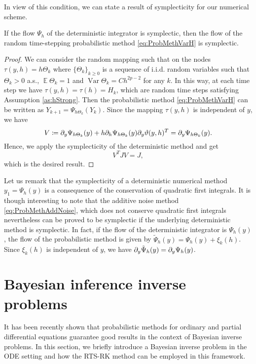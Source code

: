 \documentclass{siamart1116}
\numberwithin{theorem}{section}
\newcommand{\pdv}[2]{\ensuremath\partial_{#2}#1}
\newcommand{\defeq}{\coloneqq}
\newcommand{\Var}{\operatorname{Var}}
\newcommand{\E}{\operatorname{\mathbb{E}}}
\newcommand{\corr}[1]{{\color{bordeaux}#1}}
\begin{document}
In view of this condition, we can state a result of symplecticity for our numerical scheme.
\begin{theorem}\label{thm:SymplecticRandH} If the flow $\Psi_h$ of the deterministic integrator is symplectic, then the flow of the random time-stepping probabilistic method \eqref{eq:ProbMethVarH} is symplectic.
\end{theorem}
\corr{\begin{proof} We can consider the random mapping such that on the nodes $\tau(y, h) = h\Theta_k$ where $\{\Theta_k\}_{k \geq 0}$ is a sequence of i.i.d. random variables such that $\Theta_k > 0$ a.s., $\E\Theta_k = 1$ and $\Var\Theta_k = Ch^{2p - 2}$ for any $k$. In this way, at each time step we have $\tau(y, h) = \tau(h) = H_k$, which are random time steps satisfying Assumption \ref{as:hStrong}. Then the probabilistic method \eqref{eq:ProbMethVarH} can be written as $Y_{k+1} = \Psi_{h\Theta_k}(Y_{k})$. Since the mapping $\tau(y, h)$ is independent of $y$, we have
\begin{equation}
	V \defeq \pdv{\Psi_{h\Theta_k}(y)}{y} + h\pdv{\Psi_{h\Theta_k}(y)}{h}\pdv{\vartheta(y, h)}{y}^T = \pdv{\Psi_{h\Theta_k}(y)}{y}.
\end{equation}
Hence, we apply the symplecticity of the deterministic method and get
\begin{equation}
	V^T J V = J,
\end{equation}
which is the desired result.
\end{proof}}

\corr{\begin{remark} Let us remark that the symplecticity of a deterministic numerical method $y_1 = \Psi_h(y)$ is a consequence of the conservation of quadratic first integrals. It is though interesting to note that the additive noise method \eqref{eq:ProbMethAddNoise}, which does not conserve quadratic first integrals nevertheless can be proved to be symplectic if the underlying deterministic method is symplectic. In fact, if the flow of the deterministic integrator is $\Psi_h(y)$, the flow of the probabilistic method is given by $\tilde\Psi_h(y) = \Psi_h(y) + \xi_k(h)$. Since $\xi_k(h)$ is independent of $y$, we have $\pdv{\tilde\Psi_h(y)}{y} = \pdv{\Psi_h(y)}{y}$.	
\end{remark}}

\section{Bayesian inference inverse problems}\label{sec:BayesianInference} It has been recently shown \cite{CGS16} that probabilistic methods for ordinary and partial differential equations guarantee good results in the context of Bayesian inverse problems. In this section, we briefly introduce a Bayesian inverse problem in the ODE setting and how the RTS-RK method can be employed in this framework. 
\end{document}
